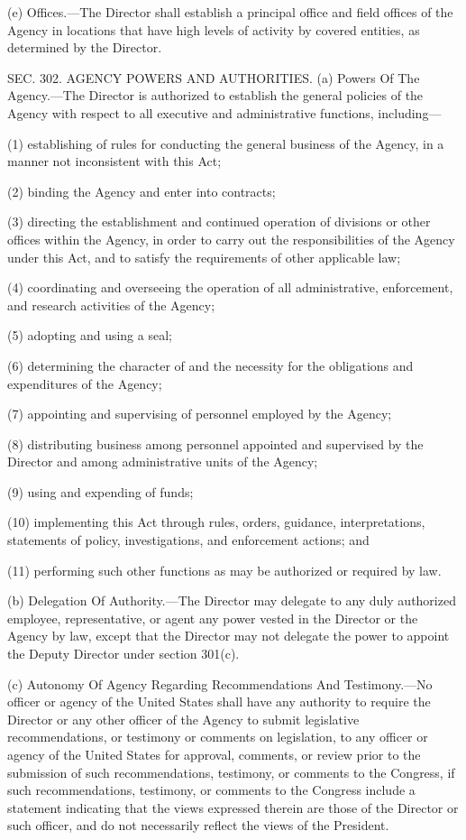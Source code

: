(e) Offices.—The Director shall establish a principal office and field offices of the Agency in locations that have high levels of activity by covered entities, as determined by the Director.


SEC. 302. AGENCY POWERS AND AUTHORITIES.
(a) Powers Of The Agency.—The Director is authorized to establish the general policies of the Agency with respect to all executive and administrative functions, including—

(1) establishing of rules for conducting the general business of the Agency, in a manner not inconsistent with this Act;

(2) binding the Agency and enter into contracts;

(3) directing the establishment and continued operation of divisions or other offices within the Agency, in order to carry out the responsibilities of the Agency under this Act, and to satisfy the requirements of other applicable law;

(4) coordinating and overseeing the operation of all administrative, enforcement, and research activities of the Agency;

(5) adopting and using a seal;

(6) determining the character of and the necessity for the obligations and expenditures of the Agency;

(7) appointing and supervising of personnel employed by the Agency;

(8) distributing business among personnel appointed and supervised by the Director and among administrative units of the Agency;

(9) using and expending of funds;

(10) implementing this Act through rules, orders, guidance, interpretations, statements of policy, investigations, and enforcement actions; and

(11) performing such other functions as may be authorized or required by law.

(b) Delegation Of Authority.—The Director may delegate to any duly authorized employee, representative, or agent any power vested in the Director or the Agency by law, except that the Director may not delegate the power to appoint the Deputy Director under section 301(c).

(c) Autonomy Of Agency Regarding Recommendations And Testimony.—No officer or agency of the United States shall have any authority to require the Director or any other officer of the Agency to submit legislative recommendations, or testimony or comments on legislation, to any officer or agency of the United States for approval, comments, or review prior to the submission of such recommendations, testimony, or comments to the Congress, if such recommendations, testimony, or comments to the Congress include a statement indicating that the views expressed therein are those of the Director or such officer, and do not necessarily reflect the views of the President.


